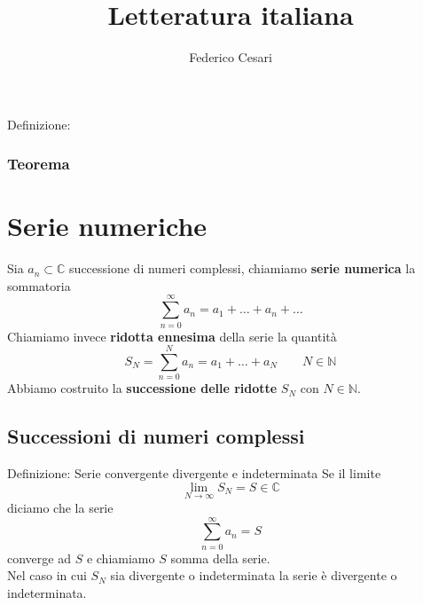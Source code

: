 \documentclass[x11names]{article}
\title{Letteratura italiana}
\author{Federico Cesari}
\date{}
\begin{document}
	

\tableofcontents
\newpage


\begin{center}
\colorbox{myblue}{\begin{minipage}{5.75in}
	\begin{blues}{Definizione: }
	\end{blues}
\end{minipage}}       
\end{center}

\begin{center}
\colorbox{myred}{\begin{minipage}{5.75in}
	\begin{redes}{}
	\subsubsection{Teorema  }
	\end{redes}
\end{minipage}}        
\end{center}






\section{Serie numeriche}
Sia \(a_{n} \subset \mathbb{C}\) successione di numeri complessi, chiamiamo \textbf{serie numerica} la sommatoria 
\[ 
\sum_{n=0}^{\infty} a_{n} = a_{1} + \dots + a_{n} + \dots
\]
Chiamiamo invece \textbf{ridotta ennesima} della serie la quantità
\[ 
S_{N} = \sum_{n=0}^{N} a_{n} = a_{1} + \dots + a_{N} \qquad N \in \mathbb{N}
\]
Abbiamo costruito la \textbf{successione delle ridotte} \(S_{N}\) con \(N\in\mathbb{N}\).

	\subsection{Successioni di numeri complessi}
	\begin{center}
		\colorbox{myblue}{\begin{minipage}{5.75in}
				\begin{blues}{Definizione: Serie convergente divergente e indeterminata}
					Se il limite 
					\[ 
					\lim_{N\to\infty}S_{N} = S \in \mathbb{C}
					\]
					diciamo che la serie 
					\[ 
					\sum_{n=0}^{\infty} a_{n} = S
					\]
					converge ad \(S\) e chiamiamo \(S\) somma della serie. \\
					
					Nel caso in cui \(S_{N}\) sia divergente o indeterminata la serie è divergente o indeterminata.
				\end{blues}
		\end{minipage}}       
	\end{center}
	
\end{document}
